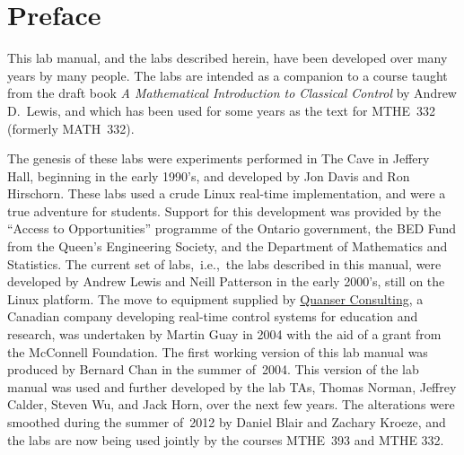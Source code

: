 \chapter*{Preface}

This lab manual, and the labs described herein, have been developed over many years by many people.  The labs are intended as a companion to a course taught from the draft book \emph{A Mathematical Introduction to Classical Control} by Andrew D.~Lewis, and which has been used for some years as the text for MTHE~332 (formerly MATH~332).

The genesis of these labs were experiments performed in The Cave in Jeffery Hall, beginning in the early 1990's, and developed by Jon Davis and Ron Hirschorn.  These labs used a crude \textsf{Linux} real-time implementation, and were a true adventure for students.  Support for this development was provided by the ``Access to Opportunities'' programme of the Ontario government, the BED Fund from the Queen's Engineering Society, and the Department of Mathematics and Statistics.  The current set of labs,~i.e.,~the labs described in this manual, were developed by Andrew Lewis and Neill Patterson in the early 2000's, still on the \textsf{Linux} platform.  The move to equipment supplied by \href{http://www.quanser.com/}{Quanser Consulting}, a Canadian company developing real-time control systems for education and research, was undertaken by Martin Guay in 2004 with the aid of a grant from the McConnell Foundation.  The first working version of this lab manual was produced by Bernard Chan in the summer of~2004.  This version of the lab manual was used and further developed by the lab TAs, Thomas Norman, Jeffrey Calder, Steven Wu, and Jack Horn, over the next few years.  The alterations were smoothed during the summer of~2012 by Daniel Blair and Zachary Kroeze, and the labs are now being used jointly by the courses MTHE~393 and MTHE 332.

